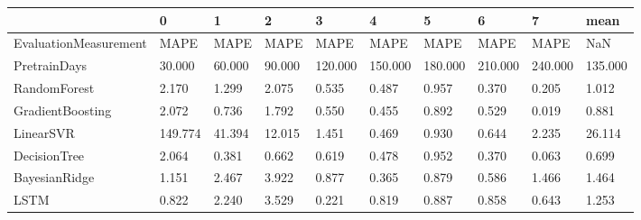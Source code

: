 \begin{tabular}{llllllllll}
\toprule
{} &       0 &      1 &      2 &       3 &       4 &       5 &       6 &       7 &    mean \\
\midrule
EvaluationMeasurement &    MAPE &   MAPE &   MAPE &    MAPE &    MAPE &    MAPE &    MAPE &    MAPE &     NaN \\
PretrainDays          &  30.000 & 60.000 & 90.000 & 120.000 & 150.000 & 180.000 & 210.000 & 240.000 & 135.000 \\
RandomForest          &   2.170 &  1.299 &  2.075 &   0.535 &   0.487 &   0.957 &   0.370 &   0.205 &   1.012 \\
GradientBoosting      &   2.072 &  0.736 &  1.792 &   0.550 &   0.455 &   0.892 &   0.529 &   0.019 &   0.881 \\
LinearSVR             & 149.774 & 41.394 & 12.015 &   1.451 &   0.469 &   0.930 &   0.644 &   2.235 &  26.114 \\
DecisionTree          &   2.064 &  0.381 &  0.662 &   0.619 &   0.478 &   0.952 &   0.370 &   0.063 &   0.699 \\
BayesianRidge         &   1.151 &  2.467 &  3.922 &   0.877 &   0.365 &   0.879 &   0.586 &   1.466 &   1.464 \\
LSTM                  &   0.822 &  2.240 &  3.529 &   0.221 &   0.819 &   0.887 &   0.858 &   0.643 &   1.253 \\
\bottomrule
\end{tabular}
